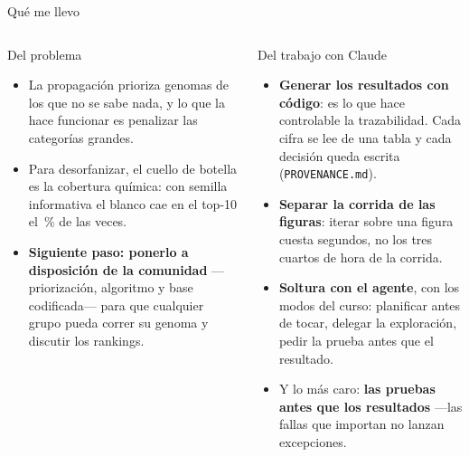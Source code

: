 \documentclass[aspectratio=169,11pt]{beamer}
\begin{document}
\begin{frame}{Qué me llevo}
\begin{columns}[T]
\begin{block}{Del problema}
\begin{itemize}\setlength\itemsep{.4em}\small
\item La propagación prioriza genomas de los que no se sabe nada, y lo que la
  hace funcionar es penalizar las categorías grandes.
\item Para desorfanizar, el cuello de botella es la cobertura química: con
  semilla informativa el blanco cae en el top-10 el \PctInfTopDiez\,\% de las
  veces.
\item \textbf{Siguiente paso: ponerlo a disposición de la comunidad}
  ---priorización, algoritmo y base codificada--- para que cualquier grupo
  pueda correr su genoma y discutir los rankings.
\end{itemize}
\end{block}
\begin{block}{Del trabajo con Claude}
\begin{itemize}\setlength\itemsep{.25em}\small
\item \textbf{Generar los resultados con código}: es lo que hace controlable la
  trazabilidad. Cada cifra se lee de una tabla y cada decisión queda escrita
  (\texttt{PROVENANCE.md}).
\item \textbf{Separar la corrida de las figuras}: iterar sobre una figura cuesta
  segundos, no los tres cuartos de hora de la corrida.
\item \textbf{Soltura con el agente}, con los modos del curso: planificar antes
  de tocar, delegar la exploración, pedir la prueba antes que el resultado.
\item Y lo más caro: \textbf{las pruebas antes que los resultados} ---las
  fallas que importan no lanzan excepciones.
\end{itemize}
\end{block}
\end{columns}
\end{frame}
\end{document}
